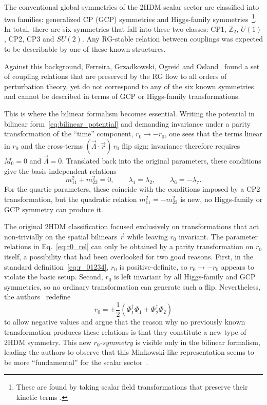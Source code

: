 \documentclass[a4paper, 11pt]{article}
\begin{document}
The conventional global symmetries of the 2HDM scalar sector are classified into two families: generalized CP (GCP) symmetries and Higgs-family symmetries~\cite{2HDM}\footnote{These are found by taking scalar field transformations that preserve their kinetic terms \cite{Trautner_goofy1}.}. In total, there are six symmetries that fall into these two classes: CP1, $\mathbb{Z}_2$, $U(1)$, CP2, CP3 and $SU(2)$. Any RG-stable relation between couplings was expected to be describable by one of these known structures.

Against this background, Ferreira, Grzadkowski, Ogreid and Osland~\cite{2HDM} found a set of coupling relations that are preserved by the RG flow to all orders of perturbation theory, yet do not correspond to any of the six known symmetries and cannot be described in terms of GCP or Higgs-family transformations.

This is where the bilinear formalism becomes essential. Writing the potential in bilinear form~\eqref{eq:bilinear_potential} and demanding invariance under a parity transformation of the ``time'' component, $r_0\to -r_0$, one sees that the terms linear in $r_0$ and the cross-terms $(\vec{\Lambda}\cdot\vec{r})\,r_0$ flip sign; invariance therefore requires $M_0=0$ and $\vec{\Lambda}=0$. Translated back into the original parameters, these conditions give the basis-independent relations
\begin{equation}
    m_{11}^2 + m_{22}^2 = 0,
    \qquad
    \lambda_1 = \lambda_2,
    \qquad
    \lambda_6 = -\lambda_7.
    \label{eq:r0_rel}
\end{equation}
For the quartic parameters, these coincide with the conditions imposed by a CP2 transformation, but the quadratic relation $m_{11}^2=-m_{22}^2$ is new, no Higgs-family or GCP symmetry can produce it.

The original 2HDM classification focused exclusively on transformations that act non-trivially on the spatial bilinears $\vec{r}$ while leaving $r_0$ invariant. The parameter relations in Eq.~\eqref{eq:r0_rel} can only be obtained by a parity transformation on $r_0$ itself, a possibility that had been overlooked for two good reasons. First, in the standard definition~\eqref{eq:r_01234}, $r_0$ is positive-definite, so $r_0\to -r_0$ appears to violate the basic setup. Second, $r_0$ is left invariant by all Higgs-family and GCP symmetries, so no ordinary transformation can generate such a flip. Nevertheless, the authors~\cite{2HDM} redefine
\begin{equation*}
    r_0=\pm \frac{1}{2}\left(\Phi_1^\dagger \Phi_1 + \Phi_2^\dagger \Phi_2\right)
\end{equation*}
to allow negative values and argue that the reason why no previously known transformation produces these relations is that they constitute a new type of 2HDM symmetry. This new \textit{$r_0$-symmetry} is visible only in the bilinear formalism, leading the authors to observe that this Minkowski-like representation seems to be more ``fundamental'' for the scalar sector~\cite{2HDM}.
\end{document}
